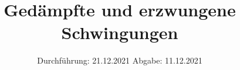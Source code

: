 

\subject{V354}
\title{Gedämpfte und erzwungene Schwingungen}
\date{%
  Durchführung: 21.12.2021
  \hspace{3em}
  Abgabe: 11.12.2021
}



\maketitle
\thispagestyle{empty}
\tableofcontents
\newpage






\printbibliography{}
\appendix
\newpage


